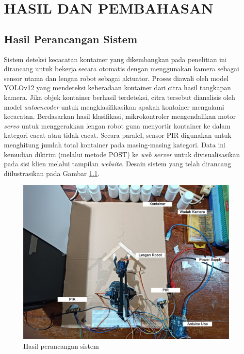 \chapter{HASIL DAN PEMBAHASAN}
\section{Hasil Perancangan Sistem}
\noindent
Sistem deteksi kecacatan kontainer yang dikembangkan pada penelitian
ini dirancang untuk bekerja secara otomatis dengan menggunakan kamera
sebagai sensor utama dan lengan robot sebagai aktuator. Proses
diawali oleh model YOLOv12 yang mendeteksi keberadaan kontainer dari
citra hasil tangkapan kamera. Jika objek kontainer berhasil
terdeteksi, citra tersebut dianalisis oleh model \textit{autoencoder}
untuk mengklasifikasikan apakah kontainer mengalami kecacatan.
Berdasarkan hasil klasifikasi, mikrokontroler mengendalikan motor
\textit{servo} untuk menggerakkan lengan robot guna menyortir
kontainer ke dalam kategori cacat atau tidak cacat. Secara paralel,
sensor PIR digunakan untuk menghitung jumlah total kontainer pada
masing-masing kategori. Data ini kemudian dikirim (melalui metode
POST) ke \textit{web server} untuk divisualisasikan pada sisi klien
melalui tampilan \textit{website}. Desain sistem yang telah dirancang
diilustrasikan pada Gambar \ref{fig:rancang-sistem}.

\begin{figure}[H]
  \centering
  \includegraphics[width=\textwidth]{gambar/rancang_sistem.jpg}
  \caption{Hasil perancangan sistem}
  \label{fig:rancang-sistem}
\end{figure}
\vspace{-1em}

